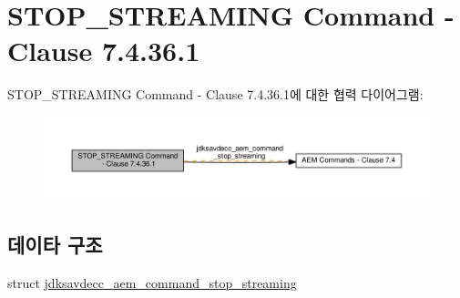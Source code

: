 \hypertarget{group__command__stop__streaming}{}\section{S\+T\+O\+P\+\_\+\+S\+T\+R\+E\+A\+M\+I\+NG Command -\/ Clause 7.4.36.1}
\label{group__command__stop__streaming}
S\+T\+O\+P\+\_\+\+S\+T\+R\+E\+A\+M\+I\+NG Command -\/ Clause 7.4.36.1에 대한 협력 다이어그램\+:
\nopagebreak
\begin{figure}[H]
\begin{center}
\leavevmode
\includegraphics[width=350pt]{group__command__stop__streaming}
\end{center}
\end{figure}
\subsection*{데이타 구조}
\begin{DoxyCompactItemize}
\item 
struct \hyperlink{structjdksavdecc__aem__command__stop__streaming}{jdksavdecc\+\_\+aem\+\_\+command\+\_\+stop\+\_\+streaming}
\end{DoxyCompactItemize}
